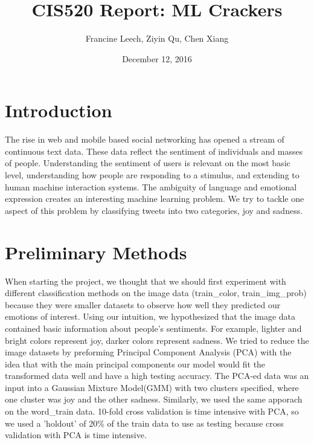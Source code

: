 \documentclass[]{article}
\begin{document}
\title{CIS520 Report: ML Crackers}   %
\author{Francine Leech, Ziyin Qu, Chen Xiang}         %
\date{December 12, 2016}    %
\maketitle

\section{Introduction}

The rise in web and mobile based social networking has opened a stream of continuous text data. These data reflect the sentiment of individuals and masses of people. Understanding the sentiment of users is relevant on the most basic level, understanding how people are responding to a stimulus, and extending to human machine interaction systems. The ambiguity of language and emotional expression creates an interesting machine learning problem.  We try to tackle one aspect of this problem by classifying tweets into two categories, joy and sadness. 

\section{Preliminary Methods}

When starting the project, we thought that we should first experiment with different classification methods on the image data (train\_color, train\_img\_prob) because they were smaller datasets to observe how well they predicted our emotions of interest. Using our intuition, we hypothesized that the image data contained basic information about people's sentiments. For example, lighter and bright colors represent joy, darker colors represent sadness. We tried to reduce the image datasets by preforming Principal Component Analysis (PCA) with the idea that with the main principal components our model would fit the transformed data well and have a high testing accuracy. The PCA-ed data was an input into a Gaussian Mixture Model(GMM) with two clusters specified, where one cluster was joy and the other sadness. Similarly, we used the same apporach on the word\_train data. 10-fold cross validation is time intensive with PCA, so we used a 'holdout' of 20\% of the train data to use as testing because cross validation with PCA is time intensive. \\
\end{document}
